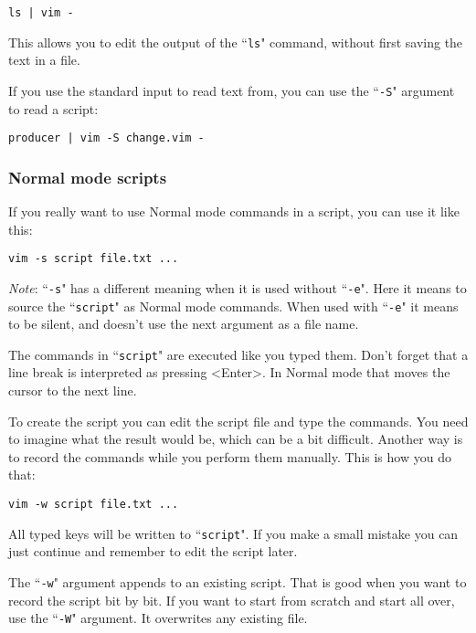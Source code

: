 \begin{Verbatim}[samepage=true]
 ls | vim -
\end{Verbatim}

This allows you to edit the output of the ``\texttt{ls}" command, without first saving the text in a file.

If you use the standard input to read text from, you can use the ``\texttt{-S}" argument to read a script:

\begin{Verbatim}[samepage=true]
 producer | vim -S change.vim -
\end{Verbatim}

\subsubsection{Normal mode scripts}
If you really want to use Normal mode commands in a script, you can use it like this:

\begin{Verbatim}[samepage=true]
 vim -s script file.txt ...
\end{Verbatim}

\emph{Note}: ``\texttt{-s}" has a different meaning when it is used without ``\texttt{-e}".
Here it means to source the ``\texttt{script}" as Normal mode commands.
When used with ``\texttt{-e}" it means to be silent, and doesn't use the next argument as a file name.

The commands in ``\texttt{script}" are executed like you typed them.
Don't forget that a line break is interpreted as pressing <Enter>.
In Normal mode that moves the cursor to the next line.

To create the script you can edit the script file and type the commands.
You need to imagine what the result would be, which can be a bit difficult.
Another way is to record the commands while you perform them manually.
This is how you do that:

\begin{Verbatim}[samepage=true]
 vim -w script file.txt ...
\end{Verbatim}

All typed keys will be written to ``\texttt{script}".
If you make a small mistake you can just continue and remember to edit the script later.

The ``\texttt{-w}" argument appends to an existing script.
That is good when you want to record the script bit by bit.
If you want to start from scratch and start all over, use the ``\texttt{-W}" argument.
It overwrites any existing file.
\clearpage

